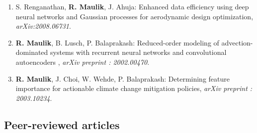 \documentclass[letterpaper]{article}
\begin{document}
\begin{enumerate}

\item S. Renganathan, \textbf{R. Maulik}, J. Ahuja: Enhanced data efficiency using deep neural networks and Gaussian processes for aerodynamic design optimization, {\it arXiv:2008.06731}.

\item \textbf{R. Maulik}, B. Lusch, P. Balaprakash: Reduced-order modeling of advection-dominated systems with recurrent neural networks and convolutional autoencoders , {\it arXiv preprint : 2002.00470}.

\item \textbf{R. Maulik}, J. Choi,  W. Wehde, P. Balaprakash: Determining feature importance for actionable climate change mitigation policies, {\it arXiv preprint : 2003.10234}.

\end{enumerate}

\subsection*{Peer-reviewed articles}
\end{document}
